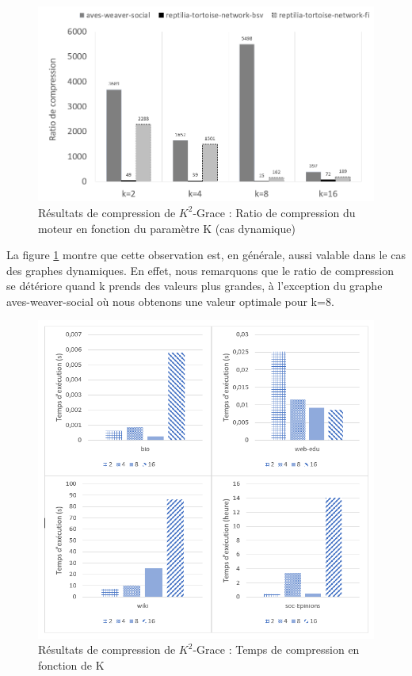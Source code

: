 \begin{figure}[H]
	\centering
	\includegraphics[scale=0.4]{ressources/image/ratioik2.png}
	
	\caption{Résultats de compression de $K^2$-Grace : Ratio de compression du moteur en fonction du paramètre K (cas dynamique)}
	\label{fig:K2-dyn-paraK-NBbits}
\end{figure}		

La figure \ref{fig:K2-dyn-paraK-NBbits} montre que cette observation est, en générale, aussi valable dans le cas des graphes dynamiques. En effet, nous remarquons que le ratio de compression se détériore quand k prends des valeurs plus grandes, à l'exception du graphe aves-weaver-social où nous obtenons une valeur optimale pour k=8. 


\begin{figure}[H]
	\centering
	\includegraphics[scale=0.9]{ressources/image/Tests/K2-Texec.png}
	
	\caption{Résultats de compression de $K^2$-Grace : Temps de compression en fonction de K}
	\label{fig:K2-Texec}
\end{figure}

